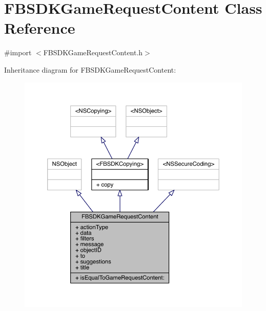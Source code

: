 \hypertarget{interface_f_b_s_d_k_game_request_content}{\section{F\-B\-S\-D\-K\-Game\-Request\-Content Class Reference}
\label{interface_f_b_s_d_k_game_request_content}
}


{\ttfamily \#import $<$F\-B\-S\-D\-K\-Game\-Request\-Content.\-h$>$}



Inheritance diagram for F\-B\-S\-D\-K\-Game\-Request\-Content\-:
\nopagebreak
\begin{figure}[H]
\begin{center}
\leavevmode
\includegraphics[width=350pt]{interface_f_b_s_d_k_game_request_content__inherit__graph}
\end{center}
\end{figure}


